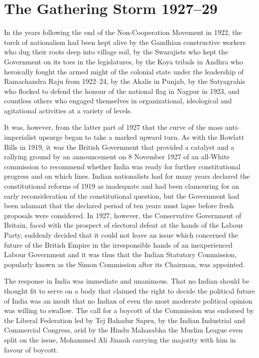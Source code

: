 \chapter{The Gathering Storm 1927--29}
\begin{multicols}{2}

In the years following the end of the Non-Cooperation Movement in 1922, the torch of nationalism had been kept alive by the Gandhian constructive workers who dug their roots deep into village soil, by the Swarajists who kept the Government on its toes in the legislatures, by the Koya tribals in Andhra who heroically fought the armed might of the colonial state under the leadership of Ramachandra Raju from 1922--24, by the Akalis in Punjab, by the Satyagrahis who flocked to defend the honour of the national flag in Nagpur in 1923, and countless others who engaged themselves in organizational, ideological and agitational activities at a variety of levels. 

It was, however, from the latter part of 1927 that the curve of the mass anti-imperialist upsurge began to take a marked upward turn. As with the Rowlatt Bills in 1919, it was the British Government that provided a catalyst and a rallying ground by an announcement on 8 November 1927 of an all-White commission to recommend whether India was ready for further constitutional progress and on which lines. Indian nationalists had for many years declared the constitutional reforms of 1919 as inadequate and had been clamouring for an early reconsideration of the constitutional question, but the Government had been adamant that the declared period of ten years must lapse before fresh proposals were considered. In 1927, however, the Conservative Government of Britain, faced with the prospect of electoral defeat at the hands of the Labour Party, suddenly decided that it could not leave an issue which concerned the future of the British Empire in the irresponsible hands of an inexperienced Labour Government and it was thus that the Indian Statutory Commission, popularly known as the Simon Commission after its Chairman, was appointed. 

The response in India was immediate and unanimous. That no Indian should be thought fit to serve on a body that claimed the right to decide the political future of India was an insult that no Indian of even the most moderate political opinion was willing to swallow. The call for a boycott of the Commission was endorsed by the Liberal Federation led by Tej Bahadur Sapru, by the Indian Industrial and Commercial Congress, arid by the Hindu Mahasabha the Muslim League even split on the issue, Mohammed Ali Jinnah carrying the majority with him in favour of boycott. 


\end{multicols}
